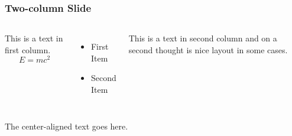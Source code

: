 \documentclass{beamer}
\begin{document}
		\begin{frame}
			\frametitle{Two-column Slide}
			\begin{columns}
				This is a text in first column.
				$$E=mc^2$$
				
				\begin{itemize}
					\item First Item
					\item Second Item
				\end{itemize}
				
				This is a text in second column and on a second thought is nice layout in some cases. 			
			\end{columns}
		\end{frame}
	
		\begin{frame}
			\begin{center}
				The center-aligned text goes here.
			\end{center}
		\end{frame}
	
	
\end{document}
